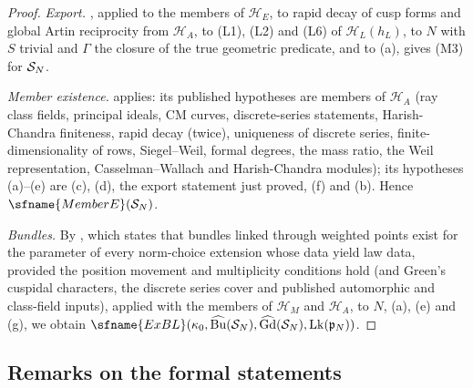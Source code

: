 \begin{proof}
\emph{Export.} , applied to the members of $\mathcal H_E$, to rapid decay of cusp forms and
global Artin reciprocity from $\mathcal H_A$, to (L1), (L2) and (L6) of
$\mathcal H_L(h_L)$, to $N$ with $S$ trivial and $\Gamma$ the closure of the true geometric predicate, and to (a), gives
(M3) for $\mathcal S_N$.

\emph{Member existence.}  applies: its published hypotheses are members of $\mathcal H_A$
(ray class fields, principal ideals, CM curves, discrete-series statements, Harish-Chandra finiteness, rapid decay (twice),
uniqueness of discrete series, finite-dimensionality of rows, Siegel--Weil, formal degrees, the mass ratio, the Weil
representation, Casselman--Wallach and Harish-Chandra modules); its hypotheses (a)--(e) are (c), (d), the export statement
just proved, (f) and (b). Hence $\sfname{MemberE}(\baselatoneS_N)$.

\emph{Bundles.} By , which states that bundles linked through
weighted points exist for the parameter of every norm-choice extension whose data yield law data, provided the position
movement and multiplicity conditions hold (and Green's cuspidal characters, the discrete series cover and published
automorphic and class-field inputs), applied with the members of $\mathcal H_M$ and $\mathcal H_A$, to $N$, (a), (e) and
(g), we obtain $\sfname{ExBL}(\kappa_0,\widehat{\mathrm{Bu}}(\baselatoneS_N),\widehat{\mathrm{Gd}}(\baselatoneS_N),
\mathrm{Lk}(\baselatoneP_N))$.
\end{proof}

\subsection{Remarks on the formal statements}\label{pf:baselat1:ssec:remarks}

